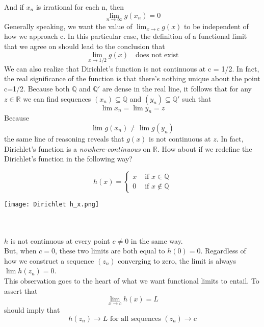 And if $x_n$ is irrational for each n, then \[
    \lim_{n \to \infty} g(x_n) = 0
\]
Generally speaking, we want the value of $\lim_{x \to c} g(x)$ to be independent of how we approach c. In this particular case, the definition of a functional limit that we agree on should lead to the conclusion that \[
    \lim_{x \to 1/2} g(x) \quad\text{does not exist}
\]
We can also realize that Dirichlet's function is not continuous at c = 1/2. In fact, the real significance of the function is that there's nothing unique about the point c=1/2. Because both $\mathbb{Q}$ and $\mathbb{Q}'$ are dense in the real line, it follows that for any $z \in \mathbb{R}$ we can find sequences $(x_n) \subseteq \mathbb{Q}$ and $(y_n) \subseteq \mathbb{Q}'$ such that \[
    \lim x_n = \lim y_n = z
\]
Because \[
    \lim g(x_n) \neq \lim g(y_n)
\]
the same line of reasoning reveals that $g(x)$ is not continuous at $z$. In fact, Dirichlet's function is a \textit{nowhere-continuous} on $\mathbb{R}$.
How about if we redefine the Dirichlet's function in the following way? \\
\begin{minipage}{0.45\textwidth}
    \begin{equation*}
        h(x) = 
        \begin{cases}
            x & \text{ if } x \in \mathbb{Q} \\
            0 & \text{ if } x \notin \mathbb{Q}
        \end{cases}
    \end{equation*}
\end{minipage}
\begin{minipage}{0.45\textwidth}
    \centering
    \texttt{[image: Dirichlet h\_x.png]}
\end{minipage} \\~\\
$h$ is not continuous at every point $c \neq 0$ in the same way. \\
But, when $c=0$, these two limits are both equal to $h(0)=0$. Regardless of how we construct a sequence $(z_n)$ converging to zero, the limit is always $\lim h(z_n)=0$. \\
This observation goes to the heart of what we want functional limits to entail. To assert that \[
    \lim_{x \to c} h(x) = L
\]
should imply that \[
    h(z_n) \to L \text{ for all sequences } (z_n) \to c
\]

